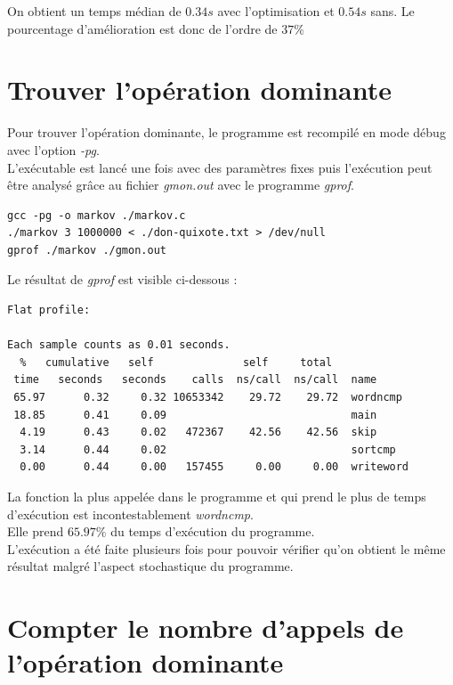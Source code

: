 \documentclass[10pt, a4paper]{article}
\begin{document}
On obtient un temps médian de $0.34s$ avec l'optimisation et $0.54s$ sans. Le
pourcentage d'amélioration est donc de l'ordre de $37\%$

\section{Trouver l'opération dominante}

Pour trouver l'opération dominante, le programme est recompilé en mode débug
avec l'option \emph{-pg}. \\

L'exécutable est lancé une fois avec des paramètres fixes puis l'exécution peut
être analysé grâce au fichier \emph{gmon.out} avec le programme \emph{gprof}. \\

\begin{verbatim}
gcc -pg -o markov ./markov.c
./markov 3 1000000 < ./don-quixote.txt > /dev/null
gprof ./markov ./gmon.out
\end{verbatim}

Le résultat de \emph{gprof} est visible ci-dessous : \\

\begin{verbatim}
Flat profile:

Each sample counts as 0.01 seconds.
  %   cumulative   self              self     total           
 time   seconds   seconds    calls  ns/call  ns/call  name    
 65.97      0.32     0.32 10653342    29.72    29.72  wordncmp
 18.85      0.41     0.09                             main
  4.19      0.43     0.02   472367    42.56    42.56  skip
  3.14      0.44     0.02                             sortcmp
  0.00      0.44     0.00   157455     0.00     0.00  writeword
\end{verbatim}

La fonction la plus appelée dans le programme et qui prend le plus de temps
d'exécution est incontestablement \emph{wordncmp}. \\
Elle prend $65.97\%$ du temps d'exécution du programme. \\

L'exécution a été faite plusieurs fois pour pouvoir vérifier qu'on obtient le
même résultat malgré l'aspect stochastique du programme. \\

\section{Compter le nombre d'appels de l'opération dominante}
\end{document}
